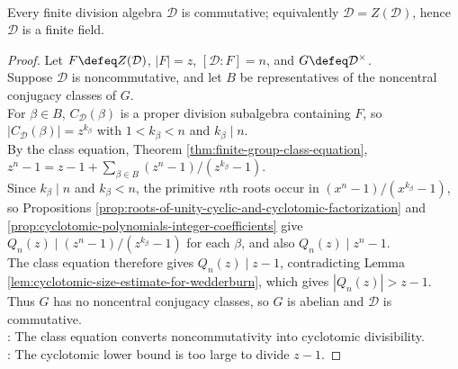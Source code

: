\begin{theorem} \label{thm:wedderburn-finite-division-algebra} \\
Every finite division algebra $\mathcal{D}$ is commutative; equivalently $\mathcal{D}=Z(\mathcal{D})$, hence $\mathcal{D}$ is a finite field.
\begin{proof}
Let $F\defeq Z(\mathcal{D})$, $|F|=z$, $[\mathcal{D}:F]=n$, and $G\defeq\mathcal{D}^{\times}$.\\
Suppose $\mathcal{D}$ is noncommutative, and let $B$ be representatives of the noncentral conjugacy classes of $G$.\\
For $\beta\in B$, $C_{\mathcal{D}}(\beta)$ is a proper division subalgebra containing $F$, so $|C_{\mathcal{D}}(\beta)|=z^{k_\beta}$ with $1<k_\beta<n$ and $k_\beta\mid n$.\\
By the class equation, Theorem \ref{thm:finite-group-class-equation}, $z^n-1=z-1+\sum_{\beta\in B}(z^n-1)/(z^{k_\beta}-1)$.\\
Since $k_\beta\mid n$ and $k_\beta<n$, the primitive $n$th roots occur in $(x^n-1)/(x^{k_\beta}-1)$, so Propositions \ref{prop:roots-of-unity-cyclic-and-cyclotomic-factorization} and \ref{prop:cyclotomic-polynomials-integer-coefficients} give $Q_n(z)\mid(z^n-1)/(z^{k_\beta}-1)$ for each $\beta$, and also $Q_n(z)\mid z^n-1$.\\
The class equation therefore gives $Q_n(z)\mid z-1$, contradicting Lemma \ref{lem:cyclotomic-size-estimate-for-wedderburn}, which gives $|Q_n(z)|>z-1$.\\
Thus $G$ has no noncentral conjugacy classes, so $G$ is abelian and $\mathcal{D}$ is commutative.\\
: The class equation converts noncommutativity into cyclotomic divisibility.\\
: The cyclotomic lower bound is too large to divide $z-1$.
\end{proof}
\end{theorem}


